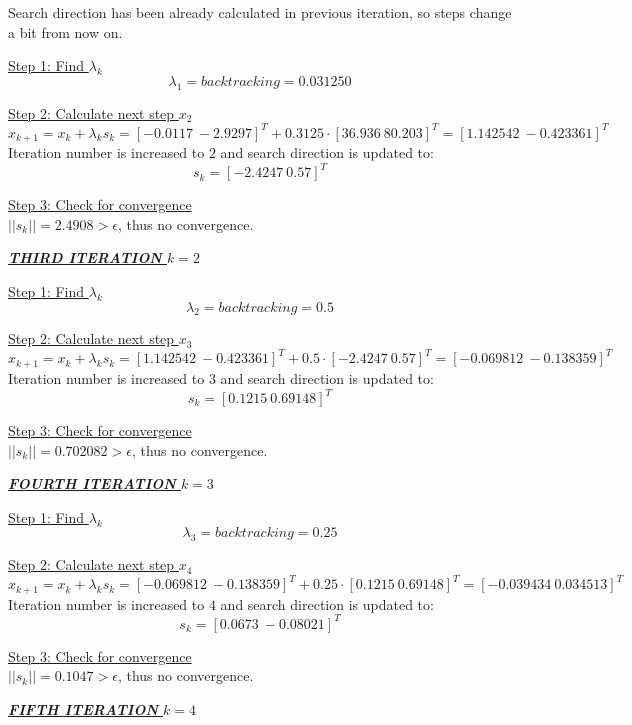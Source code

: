 Search direction has been already calculated in previous iteration, so steps change a bit from now on.

\underline{Step 1: Find $\lambda_k$}
\[
\lambda_1 = \textit{backtracking} = 0.031250
\]

\underline{Step 2: Calculate next step $x_{2}$}
\[
x_{k+1} = x_k + \lambda_k s_k = [-0.0117\  -2.9297]^T + 0.3125 \cdot [36.936\  80.203]^T = [1.142542\ -0.423361]^T
\]
Iteration number is increased to $2$ and search direction is updated to:
\[
s_k = [-2.4247\ 0.57]^T
\]

\underline{Step 3: Check for convergence}\\[2mm]
$||s_k|| = 2.4908 > \epsilon$, thus no convergence.\\[3mm]


\begin{center}
	\underline{\textit{\textbf{THIRD ITERATION} $k=2$}}
\end{center}

\underline{Step 1: Find $\lambda_k$}
\[
\lambda_2 = \textit{backtracking} = 0.5
\]

\underline{Step 2: Calculate next step $x_{3}$}
\[
x_{k+1} = x_k + \lambda_k s_k = [1.142542\ -0.423361]^T + 0.5 \cdot [−2.4247\  0.57]^T = [-0.069812\ -0.138359]^T
\]
Iteration number is increased to $3$ and search direction is updated to:
\[
s_k = [0.1215\ 0.69148]^T
\]

\underline{Step 3: Check for convergence}\\[2mm]
$||s_k|| = 0.702082 > \epsilon$, thus no convergence.\\[3mm]


\begin{center}
	\underline{\textit{\textbf{FOURTH ITERATION} $k=3$}}
\end{center}

\underline{Step 1: Find $\lambda_k$}
\[
\lambda_3 = \textit{backtracking} = 0.25
\]

\underline{Step 2: Calculate next step $x_{4}$}
\[
x_{k+1} = x_k + \lambda_k s_k = [-0.069812\ -0.138359]^T + 0.25 \cdot [0.1215\  0.69148]^T = [-0.039434\ 0.034513]^T
\]
Iteration number is increased to $4$ and search direction is updated to:
\[
s_k = [0.0673\ -0.08021]^T
\]

\underline{Step 3: Check for convergence}\\[2mm]
$||s_k|| = 0.1047 > \epsilon$, thus no convergence.\\[3mm]


\begin{center}
	\underline{\textit{\textbf{FIFTH ITERATION} $k=4$}}
\end{center}

